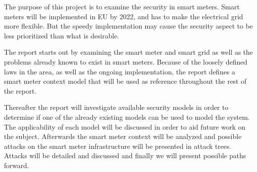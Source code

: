 The purpose of this project is to examine the security in smart meters.
Smart meters will be implemented in EU by 2022, and has to make the electrical grid more flexible.
But the speedy implementation may cause the security aspect to be less prioritized than what is desirable.

The report starts out by examining the smart meter and smart grid as well as the problems already known to exist in smart meters.
Because of the loosely defined laws in the area, as well as the ongoing implementation, the report defines a smart meter context model that will be used as reference throughout the rest of the report.

Thereafter the report will investigate available security models in order to determine if one of the already existing models can be used to model the system.
The applicability of each model will be discussed in order to aid future work on the subject.
Afterwards the smart meter context will be analyzed and possible attacks on the smart meter infrastructure will be presented in attack trees.
Attacks will be detailed and discussed and finally we will present possible paths forward.
